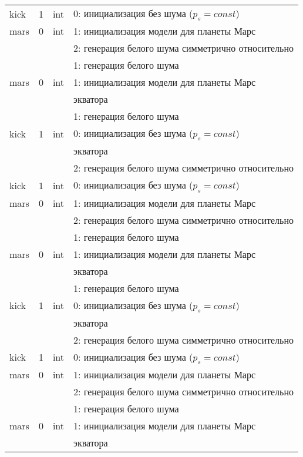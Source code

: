 \begin{longtable}[c]{|l|c|l|l|}
      kick & 1 & int & 0: инициализация без шума (\(p_s = const\)) \\
     mars & 0 & int & 1: инициализация модели для планеты Марс     \\
    &   &     & 2: генерация белого шума симметрично относительно \\
          &   &     & 1: генерация белого шума                  \\
          mars & 0 & int & 1: инициализация модели для планеты Марс     \\
      & & & экватора    \\
     &   &     & 1: генерация белого шума                  \\
    kick & 1 & int & 0: инициализация без шума (\(p_s = const\)) \\
          & & & экватора    \\
          &   &     & 2: генерация белого шума симметрично относительно \\
      kick & 1 & int & 0: инициализация без шума (\(p_s = const\)) \\
     mars & 0 & int & 1: инициализация модели для планеты Марс     \\
    &   &     & 2: генерация белого шума симметрично относительно \\
          &   &     & 1: генерация белого шума                  \\
          mars & 0 & int & 1: инициализация модели для планеты Марс     \\
      & & & экватора    \\
     &   &     & 1: генерация белого шума                  \\
    kick & 1 & int & 0: инициализация без шума (\(p_s = const\)) \\
          & & & экватора    \\
          &   &     & 2: генерация белого шума симметрично относительно \\
      kick & 1 & int & 0: инициализация без шума (\(p_s = const\)) \\
     mars & 0 & int & 1: инициализация модели для планеты Марс     \\
    &   &     & 2: генерация белого шума симметрично относительно \\
          &   &     & 1: генерация белого шума                  \\
          mars & 0 & int & 1: инициализация модели для планеты Марс     \\
      & & & экватора    \\

\end{longtable}
